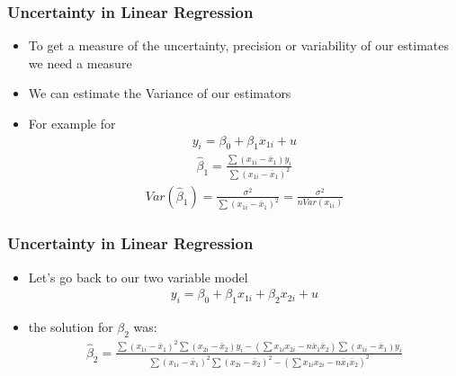 \documentclass[
  shownotes,
  xcolor={svgnames},
  hyperref={colorlinks,citecolor=DarkBlue,linkcolor=andesred,urlcolor=DarkBlue}
  , aspectratio=169]{beamer}
\begin{document}
\begin{frame}
\frametitle{ Uncertainty in Linear Regression}

\begin{itemize}
  \item To get a measure of the uncertainty, precision or variability of our estimates we need a measure
  \medskip
  \item We can estimate the Variance of our estimators
  \medskip
  \item For example for
  \begin{align}
  y_{i}=\beta_{0}+\beta_{1}x_{1i}+u
  \end{align}
  \begin{align}
  \hat{\beta}_{1} = \frac{\sum(x_{1i}-\bar{x}_{1})y_{i}}{\sum(x_{1i}-\bar{x}_{1})^{2}}
  \end{align}
  \begin{align}
  Var(\hat{\beta}_{1}) = \frac{\sigma^2}{\sum(x_{1i}-\bar{x}_{1})^{2}}=\frac{\sigma^2}{nVar(x_{1i})}
  \end{align}
\end{itemize}

\end{frame}

\begin{frame}
\frametitle{ Uncertainty in Linear Regression}

\begin{itemize}
  \item Let's go back to our two variable model
  \medskip
  \begin{align}
    y_{i}=\beta_{0}+\beta_{1}x_{1i}+\beta_{2}x_{2i}+u
  \end{align}
  \item the solution for $\beta_2$ was:
  \medskip
  \begin{align}
\hat{\beta}_{2}=\frac{\sum(x_{1i}-\bar{x}_{1})^{2}\sum(x_{2i}-\bar{x}_{2})y_{i}-\left( \sum x_{1i}x_{2i}-n\bar{x}_{1}\bar{x}_{2} \right)\sum(x_{1i}-\bar{x}_{1})y_{i}}{\sum(x_{1i}-\bar{x}_{1})^{2}\sum(x_{2i}-\bar{x}_{2})^{2}-\left( \sum x_{1i}x_{2i}-n\bar{x}_{1}\bar{x}_{2}\right)^{2}}
\end{align}
\end{itemize}
\end{frame}
\end{document}
